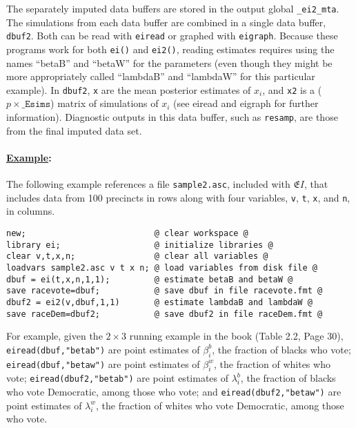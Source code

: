 \documentclass[11pt,titlepage]{article}
\newcommand{\EI}{\ensuremath{{\mathfrak EI}}}
\begin{document}
The separately imputed data buffers are stored in the output global
\texttt{\_ei2\_mta}.  The simulations from each data buffer are
combined in a single data buffer, \texttt{dbuf2}.  Both can be read
with \texttt{eiread} or graphed with \texttt{eigraph}. Because these
programs work for both \texttt{ei()} and \texttt{ei2()}, reading
estimates requires using the names ``betaB'' and ``betaW'' for the
parameters (even though they might be more appropriately called
``lambdaB'' and ``lambdaW'' for this particular example).  In
\texttt{dbuf2}, \texttt{x} are the mean posterior estimates of $x_i$,
and \texttt{x2} is a ($p\times\texttt{\_Esims}$) matrix of simulations
of $x_i$ (see eiread and eigraph for further information).  Diagnostic
outputs in this data buffer, such as \texttt{resamp}, are those from
the final imputed data set.

\paragraph{\underline{Example}:}
The following example references a file \texttt{sample2.asc}, included
with \EI, that includes data from 100 precincts in rows along with
four variables, \texttt{v}, \texttt{t}, \texttt{x}, and \texttt{n}, in
columns.
\begin{verbatim}
new;                          @ clear workspace @
library ei;                   @ initialize libraries @
clear v,t,x,n;                @ clear all variables @
loadvars sample2.asc v t x n; @ load variables from disk file @
dbuf = ei(t,x,n,1,1);         @ estimate betaB and betaW @
save racevote=dbuf;           @ save dbuf in file racevote.fmt @
dbuf2 = ei2(v,dbuf,1,1)       @ estimate lambdaB and lambdaW @
save raceDem=dbuf2;           @ save dbuf2 in file raceDem.fmt @
\end{verbatim}

For example, given the $2\times 3$ running example in the book (Table
2.2, Page 30), \texttt{eiread(dbuf,"betab")} are point estimates of
$\beta_i^b$, the fraction of blacks who vote;
\texttt{eiread(dbuf,"betaw")} are point estimates of $\beta_i^w$, the
fraction of whites who vote; \texttt{eiread(dbuf2,"betab")} are point
estimates of $\lambda_i^b$, the fraction of blacks who vote
Democratic, among those who vote; and \texttt{eiread(dbuf2,"betaw")}
are point estimates of $\lambda_i^w$, the fraction of whites who vote
Democratic, among those who vote.
\end{document}
